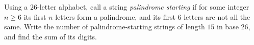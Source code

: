 Using a $26$-letter alphabet, call a string \emph{palindrome starting} if for some integer $n\ge6$ its first $n$ letters form a palindrome, and its first $6$ letters are not all the same. Write the number of palindrome-starting strings of length $15$ in base $26$, and find the sum of its digits.
